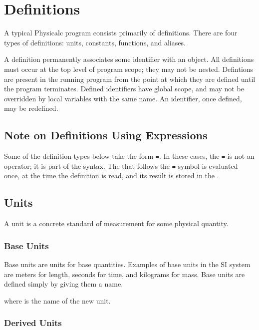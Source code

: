 \section{Definitions}
\label{definitions}

A typical Physicalc program consists primarily of definitions.  There
are four types of definitions: units, constants,
functions, and aliases.  

A definition permanently associates some identifier with an object.
All definitions must occur at the top level of program scope; they may
not be nested.  Defintions are present in the running program from the
point at which they are defined until the program terminates.  Defined
identifiers have global scope, and may not be overridden by local
variables with the same name.  An identifier, once defined, may be
redefined.

\subsection{Note on Definitions Using Expressions}

Some of the definition types below take the form \id{}\verb|=|\expr{}.
In these cases, the \verb|=| is not an operator; it is part of the
syntax.  The \expr{} that follows the \verb|=| symbol is evaluated
once, at the time the definition is read, and its result is stored in
the \id{}.


\subsection{Units}
\label{units}

A unit is a concrete standard of measurement for some physical
quantity.


\subsubsection{Base Units}

Base units are units for base quantities.  Examples of base units in
the SI system are meters for length, seconds for time, and kilograms
for mass.\cite{base-unit} Base units are defined simply by giving them
a name.

\begin{syntax}
 \id{}
\end{syntax}
where \id{} is the name of the new unit.


\subsubsection{Derived Units}

